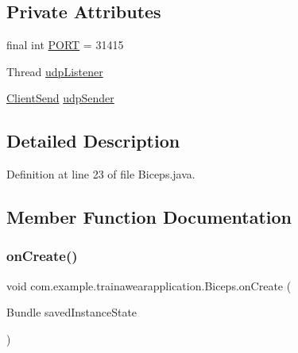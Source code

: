 \subsection*{Private Attributes}
\begin{DoxyCompactItemize}
\item 
final int \mbox{\hyperlink{classcom_1_1example_1_1trainawearapplication_1_1_biceps_adb998a91a1fac06d100f9c192df14bbe}{P\+O\+RT}} = 31415
\item 
Thread \mbox{\hyperlink{classcom_1_1example_1_1trainawearapplication_1_1_biceps_a066fa540c01d0299cab5c4a1a2cf2f5f}{udp\+Listener}}
\item 
\mbox{\hyperlink{classcom_1_1example_1_1trainawearapplication_1_1_client_send}{Client\+Send}} \mbox{\hyperlink{classcom_1_1example_1_1trainawearapplication_1_1_biceps_acfb63670051beb8e048beea485e8576a}{udp\+Sender}}
\end{DoxyCompactItemize}


\subsection{Detailed Description}


Definition at line 23 of file Biceps.\+java.



\subsection{Member Function Documentation}
\mbox{\label{classcom_1_1example_1_1trainawearapplication_1_1_biceps_abcdfd60742e9da12033fad625275ca4f}} 
\subsubsection{\texorpdfstring{onCreate()}{onCreate()}}
{\footnotesize\ttfamily void com.\+example.\+trainawearapplication.\+Biceps.\+on\+Create (\begin{DoxyParamCaption}\item[{Bundle}]{saved\+Instance\+State }\end{DoxyParamCaption})\hspace{0.3cm}{\ttfamily [protected]}}



